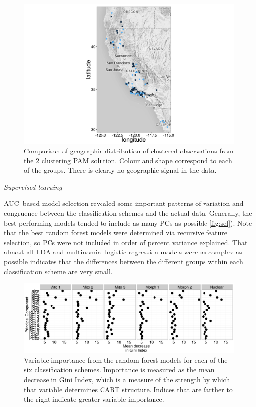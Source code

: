 \documentclass[12pt,letterpaper]{article}
\renewcommand{\subsection}[1]{%
\bigskip
\begin{center}
\begin{large}
\normalfont\itshape #1
\end{large}
\end{center}}
\begin{document}
\begin{figure}[h]
  \centering
  \includegraphics[height = 0.5\textheight, width = \textwidth, keepaspectratio = true]{figure/gap_map}
  \caption{Comparison of geographic distribution of clustered observations from the 2 clustering PAM solution. Colour and shape correspond to each of the groups. There is clearly no geographic signal in the data.}
  \label{fig:gap_map}
\end{figure}


\subsection{Supervised learning}
AUC--based model selection revealed some important patterns of variation and congruence between the classification schemes and the actual data. Generally, the best performing models tended to include as many PCs as possible \ref{fig:sel}). Note that the best random forest models were determined via recursive feature selection, so PCs were not included in order of percent variance explained. That almost all LDA and multinomial logistic regression models were as complex as possible indicates that the differences between the different groups within each classification scheme are very small.

\begin{figure}[h]
  \centering
  \includegraphics[height = 0.5\textheight, width = \textwidth, keepaspectratio = true]{figure/var_imp}
  \caption{Variable importance from the random forest models for each of the six classification schemes. Importance is measured as the mean decrease in Gini Index, which is a measure of the strength by which that variable determines CART structure. Indices that are farther to the right indicate greater variable importance.}
  \label{fig:var_imp}
\end{figure}
\end{document}
